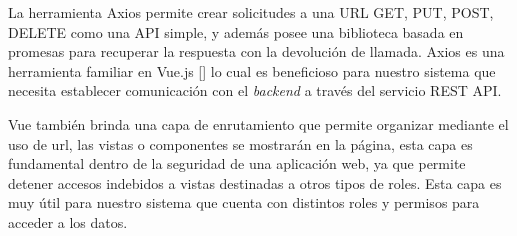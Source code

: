 


La herramienta Axios permite crear solicitudes a una URL GET, PUT, POST, DELETE como una API simple, y además posee una biblioteca basada en promesas para recuperar la respuesta con la devolución de llamada. Axios es una herramienta familiar en Vue.js [\cite{46}] lo cual es beneficioso para nuestro sistema que necesita establecer comunicación con el \textit{backend} a través del servicio REST API.

Vue también brinda una capa de enrutamiento que permite organizar mediante el uso de url, las vistas o componentes se mostrarán en la página, esta capa es fundamental dentro de la seguridad de una aplicación web, ya que permite detener accesos indebidos a vistas destinadas a otros tipos de roles.
Esta capa es muy útil para nuestro sistema que cuenta con distintos roles y permisos para acceder a los datos.


